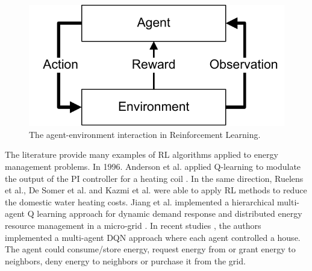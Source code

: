 %
\begin{figure}[b]
\sidecaption
\includegraphics[scale=.65]{images/Single_Agent_RL.pdf}
%
%
\caption{The agent-environment interaction in Reinforcement Learning.}
\label{fig:1}       %
\end{figure}


The literature provide many examples of RL algorithms applied to energy management problems. In 1996. Anderson et al. applied Q-learning to modulate the output of the PI controller for a heating coil \cite{ANDERSON1997421, Li6519950}. In the same direction, Ruelens et al.\cite{Ruelens7038106, Ruelens7792709}, De Somer et al. \cite{Somer8260152} and Kazmi et al. \cite{KAZMI2018159} were able to apply RL methods to reduce the domestic water heating costs. Jiang et al. implemented a hierarchical multi-agent Q learning approach for dynamic demand response and distributed energy resource management in a micro-grid \cite{Jiang6912013}. In recent studies \cite{ANVARIMOGHADDAM201741, prasad2018multiagent, LU2018220}, the authors implemented a multi-agent DQN approach where each agent controlled a house. The agent could consume/store energy, request energy from or grant energy to neighbors, deny energy to neighbors or purchase it from the grid.

